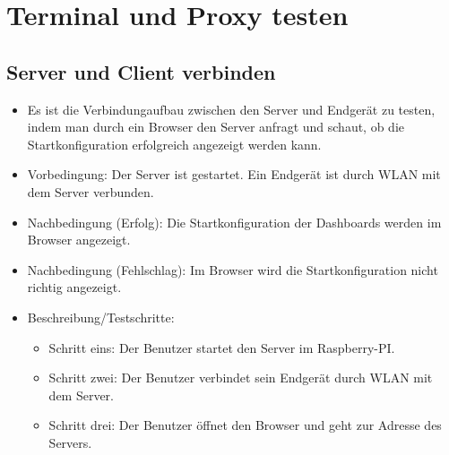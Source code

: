 \documentclass[qualitaetssicherung.tex]{subfiles}
\begin{document}
\section{Terminal und Proxy testen}

	\subsection{Server und Client verbinden}
		\begin{itemize}
			\item
			Es ist die Verbindungaufbau zwischen den Server und Endgerät zu testen, indem
			man durch ein Browser den Server anfragt und schaut, ob die
			Startkonfiguration erfolgreich angezeigt werden kann.
			\item
			Vorbedingung: Der Server ist gestartet. Ein Endgerät ist durch WLAN mit dem
			Server verbunden.
			\item
			Nachbedingung (Erfolg): Die Startkonfiguration der Dashboards werden im
			Browser angezeigt.
			\item
			Nachbedingung (Fehlschlag): Im Browser wird die Startkonfiguration nicht
			richtig angezeigt.
			\item
			Beschreibung/Testschritte:
			\begin{itemize}
				\item
				Schritt eins: Der Benutzer startet den Server im Raspberry-PI.
				\item
				Schritt zwei: Der Benutzer verbindet sein Endgerät durch WLAN mit dem
				Server.
				\item  
				Schritt drei: Der Benutzer öffnet den Browser und geht zur Adresse des
				Servers.
			\end{itemize}
		\end{itemize}
		
\end{document}
